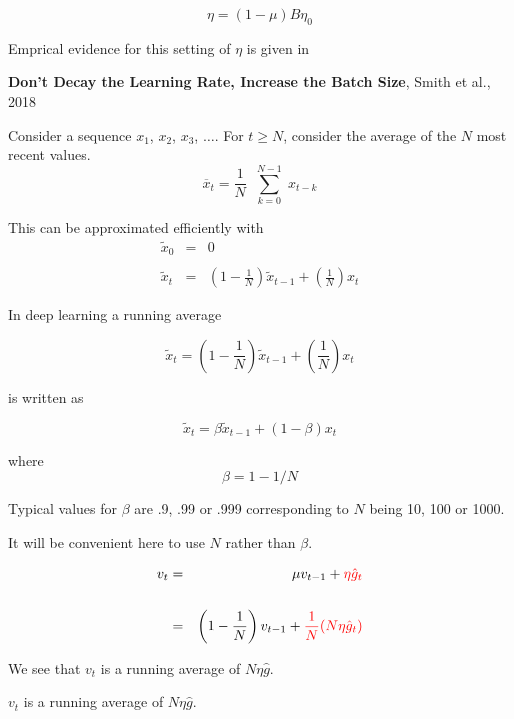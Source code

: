 {

{\color{red} $$\eta = (1-\mu)B\eta_0$$}

\vfill
Emprical evidence for this setting of $\eta$ is given in

\vfill
{\bf Don't Decay the Learning Rate, Increase the Batch Size}, Smith et al., 2018

Consider a sequence $x_1$, $x_2$, $x_3$, $\ldots$.
\vfill
For $t \geq N$, consider the average of the $N$ most recent values.
$$\overline{x}_t = \frac{1}{N} \;\; \sum_{k = 0}^{N-1}\; x_{t-k}$$

\vfill
This can be approximated efficiently with
\begin{eqnarray*}
\tilde{x}_0 & = & 0 \\
\\
\tilde{x}_t & = & \left(1-\frac{1}{N}\right)\tilde{x}_{t-1} + \left(\frac{1}{N}\right)x_t
\end{eqnarray*}


In deep learning a running average

$$\tilde{x}_t = \left(1-\frac{1}{N}\right)\tilde{x}_{t-1} + \left(\frac{1}{N}\right)x_t$$

\vfill
is written as

$$\tilde{x}_t = \beta\tilde{x}_{t-1} + (1-\beta)x_t$$

\vfill
where
$$\beta = 1 - 1/N$$

\vfill
Typical values for $\beta$ are .9, .99 or .999 corresponding to $N$ being 10, 100 or 1000.

\vfill
It will be convenient here to use $N$ rather than $\beta$.


\begin{eqnarray*}
v_t & = & \mu v_{t-1} + {\color{red} \eta \hat{g}_t} \\
\\
& = & \left(1-\frac{1}{N}\right) v_{t-1} + {\color{red} \frac{1}{N}(N\eta \hat{g}_t)}
\end{eqnarray*}

\vfill
We see that $v_t$ is a running average of $N \eta \hat{g}$.


\centerline{\color{red} $v_t$ is a running average of $N \eta \hat{g}$.}

}
